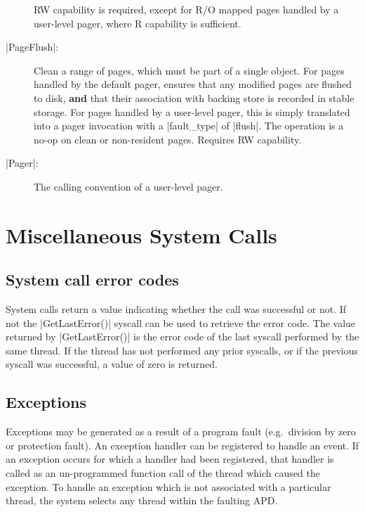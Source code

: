 \documentclass[a4paper,11pt,twoside,dvips]{report}
\begin{document}
\begin{description}
RW capability is required, except for R/O mapped pages handled by a
user-level pager, where R capability is sufficient.



\item[|PageFlush|:] Clean a range of pages, which must be part of a
single object. For pages handled by the default pager, ensures that any
modified pages are flushed to disk, \textbf{and} that their association
with backing store is recorded in stable storage. For pages handled by a
user-level pager, this is simply translated into a pager invocation with
a |fault\_type| of |flush|. The operation is a no-op on clean or
non-resident pages. Requires RW capability.

\item[|Pager|:] The calling convention of a user-level pager.
\end{description}



\chapter{\label{s:misc}Miscellaneous System Calls}

\section{\label{s:error}System call error codes}

System calls return a value indicating whether the call was successful
or not. If not the |GetLastError()| syscall can be used to retrieve the
error code. The value returned by |GetLastError()| is the error code of
the last syscall performed by the same thread. If the thread has not
performed any prior syscalls, or if the previous syscall was successful,
a value of zero is returned.

\section{\label{s:excpt}Exceptions}

Exceptions may be generated as a result of a program fault (e.g.\
division by zero or protection fault). An exception handler can be
registered to handle an event. If an exception occurs for which a
handler had been registered, that handler is called as an un-programmed
function call of the thread which caused the exception. To handle an
exception which is not associated with a particular thread, the
system selects any thread within the faulting APD.
\end{document}
